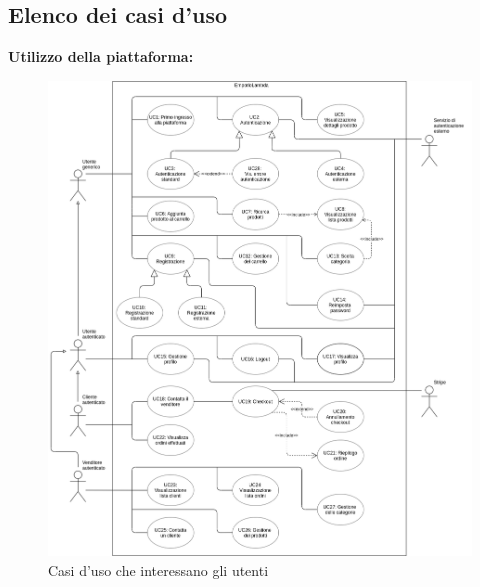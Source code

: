     \subsection{Elenco dei casi d'uso}
        \textbf{Utilizzo della piattaforma:}
        \vspace{-10px}
        \begin{figure}[!ht]
            \caption{Casi d'uso che interessano gli utenti}
            \vspace{10px}
            \includegraphics[scale=0.42]{../../../Images/AnalisiRequisiti/casiUso}
            \centering
        \end{figure}
        \newpage
        
        
        
        
        
        
        
        
        
        
        
        
        
        
        
        
        
        
        
        
        
        
        
        
        
        
        
            